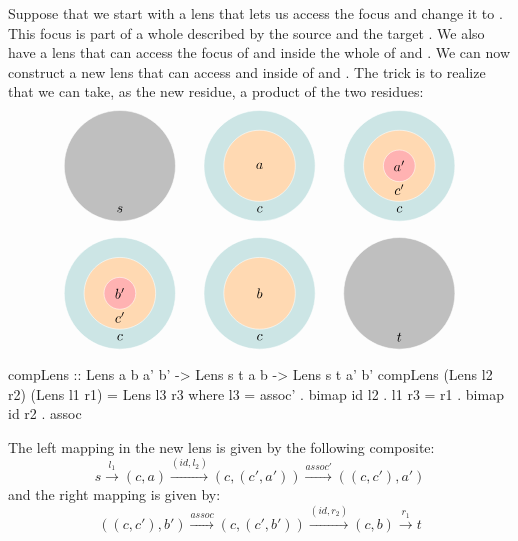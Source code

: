 \documentclass[DaoFP]{subfiles}
\begin{document}
Suppose that we start with a lens that lets us access the focus   and change it to . This focus is part of a whole described by the source  and the target . We also have a lens that can access the focus of  and  inside the whole of  and . We can now construct a new lens that can access  and  inside of  and . The trick is to realize that we can take, as the new residue, a product of the two residues:
\[
\begin{tikzpicture}
\filldraw[fill=gray!50, draw=white] (0, 0) circle (1.4);
\node at (0, -1.1) {$s$};
\end{tikzpicture}
\hspace{20pt}
\begin{tikzpicture}
\filldraw[fill=blue!50!green!20, draw=white] (0, 0) circle (1.4);
\filldraw[fill=orange!30, draw=white] (0, 0) circle (0.9);
\node at (0, 0) {$a$};
\node at (0, -1.1) {$c$};
\end{tikzpicture}
\hspace{20pt}
\begin{tikzpicture}
\filldraw[fill=blue!50!green!20, draw=white] (0, 0) circle (1.4);
\filldraw[fill=orange!30, draw=white] (0, 0) circle (0.9);
\filldraw[fill=red!30, draw=white] (0, 0) circle (0.4);
\node at (0, 0) {$a'$};
\node at (0, -0.6) {$c'$};
\node at (0, -1.1) {$c$};
\end{tikzpicture}
\]

\[
\begin{tikzpicture}
\filldraw[fill=blue!50!green!20, draw=white] (0, 0) circle (1.4);
\filldraw[fill=orange!30, draw=white] (0, 0) circle (0.9);
\filldraw[fill=red!30, draw=white] (0, 0) circle (0.4);
\node at (0, 0) {$b'$};
\node at (0, -0.6) {$c'$};
\node at (0, -1.1) {$c$};
\end{tikzpicture}
\hspace{20pt}
\begin{tikzpicture}
\filldraw[fill=blue!50!green!20, draw=white] (0, 0) circle (1.4);
\filldraw[fill=orange!30, draw=white] (0, 0) circle (0.9);
\node at (0, 0) {$b$};
\node at (0, -1.1) {$c$};
\end{tikzpicture}
\hspace{20pt}
\begin{tikzpicture}
\filldraw[fill=gray!50, draw=white] (0, 0) circle (1.4);
\node at (0, -1.1) {$t$};
\end{tikzpicture}
\]



\begin{haskell}
compLens :: Lens a b a' b' -> Lens s t a b -> Lens s t a' b'
compLens (Lens l2 r2) (Lens l1 r1) = Lens l3 r3
  where l3 = assoc' . bimap id l2  . l1
        r3 = r1 . bimap id r2 . assoc
\end{haskell}
The left mapping in the new lens is given by the following composite:
\[ s \xrightarrow{l_1} (c, a)   \xrightarrow{(id, l_2)} (c, (c', a'))  \xrightarrow{assoc'} ((c, c'), a')\]
and the right mapping is given by:
\[ ((c, c'), b') \xrightarrow{assoc}  (c, (c', b')) \xrightarrow{(id, r_2)} (c, b) \xrightarrow{r_1} t \]
\end{document}

